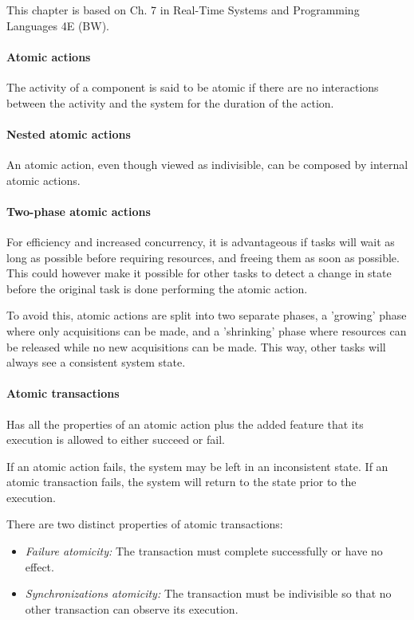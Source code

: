 
This chapter is based on Ch. 7 in Real-Time Systems and Programming Languages 4E (BW).

\sepline

\paragraph{Atomic actions} The activity of a component is said to be atomic if there are no interactions between the activity and the system for the duration of the action.

\paragraph{Nested atomic actions} An atomic action, even though viewed as indivisible, can be composed by internal atomic actions.

\paragraph{Two-phase atomic actions} For efficiency and increased concurrency, it is advantageous if tasks will wait as long as possible before requiring resources, and freeing them as soon as possible. This could however make it possible for other tasks to detect a change in state before the original task is done performing the atomic action.

To avoid this, atomic actions are split into two separate phases, a 'growing' phase where only acquisitions can be made, and a 'shrinking' phase where resources can be released while no new acquisitions can be made. This way, other tasks will always see a consistent system state.

\paragraph{Atomic transactions} Has all the properties of an atomic action plus the added feature that its execution is allowed to either succeed or fail.

If an atomic action fails, the system may be left in an inconsistent state. If an atomic transaction fails, the system will return to the state prior to the execution.

There are two distinct properties of atomic transactions:
\begin{itemize}[nolistsep,noitemsep]
  \item \textit{Failure atomicity:} The transaction must complete successfully or have no effect.
  \item \textit{Synchronizations atomicity:} The transaction must be indivisible so that no other transaction can observe its execution.
\end{itemize}

